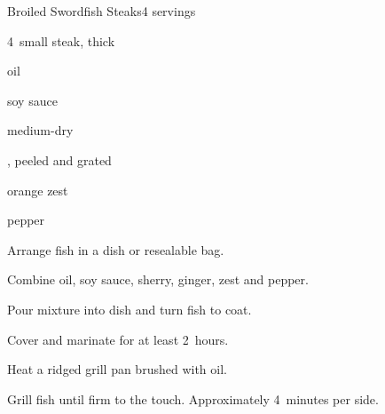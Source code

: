 \begin{recipe}{Broiled Swordfish Steaks}{}{4 servings}

\begin{ingredients}
\item 4~small  steak, \inch{\threequarter} thick
\item \C{\half} oil
\item {} soy sauce
\item {} medium-dry 
\item \tp{1\half} , peeled and grated
\item {} orange zest
\item pepper
\end{ingredients}

\begin{directions}
\item Arrange fish in a dish or resealable bag.
\item Combine oil, soy sauce, sherry, ginger, zest and pepper.
\item Pour mixture into dish and turn fish to coat.
\item Cover and marinate for at least 2~hours.
\item Heat a ridged grill pan brushed with oil.
\item Grill fish until firm to the touch. Approximately 4~minutes per side.
\end{directions}

\end{recipe}
